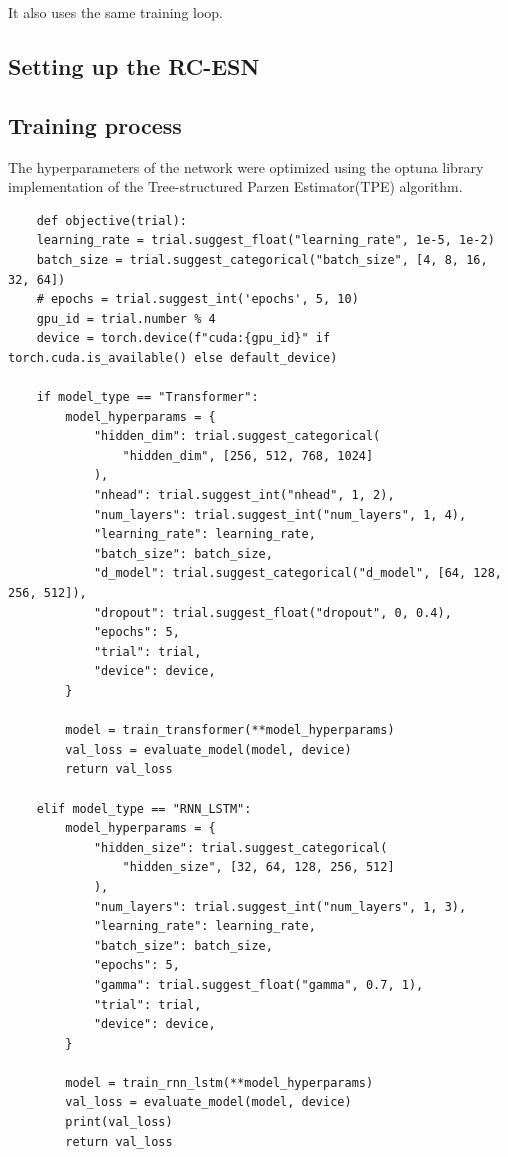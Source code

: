 \documentclass[11pt]{article}
\begin{document}
It also uses the same training loop.

\subsection{Setting up the RC-ESN}

\subsection{Training process}
The hyperparameters of the network were optimized using the optuna library implementation of the Tree-structured Parzen Estimator(TPE) algorithm. 

\begin{lstlisting}
    def objective(trial):
    learning_rate = trial.suggest_float("learning_rate", 1e-5, 1e-2)
    batch_size = trial.suggest_categorical("batch_size", [4, 8, 16, 32, 64])
    # epochs = trial.suggest_int('epochs', 5, 10)
    gpu_id = trial.number % 4  
    device = torch.device(f"cuda:{gpu_id}" if torch.cuda.is_available() else default_device)

    if model_type == "Transformer":
        model_hyperparams = {
            "hidden_dim": trial.suggest_categorical(
                "hidden_dim", [256, 512, 768, 1024]
            ),
            "nhead": trial.suggest_int("nhead", 1, 2),
            "num_layers": trial.suggest_int("num_layers", 1, 4),
            "learning_rate": learning_rate,
            "batch_size": batch_size,
            "d_model": trial.suggest_categorical("d_model", [64, 128, 256, 512]),
            "dropout": trial.suggest_float("dropout", 0, 0.4),
            "epochs": 5,
            "trial": trial,
            "device": device,
        }

        model = train_transformer(**model_hyperparams)
        val_loss = evaluate_model(model, device)
        return val_loss

    elif model_type == "RNN_LSTM":
        model_hyperparams = {
            "hidden_size": trial.suggest_categorical(
                "hidden_size", [32, 64, 128, 256, 512]
            ),
            "num_layers": trial.suggest_int("num_layers", 1, 3),
            "learning_rate": learning_rate,
            "batch_size": batch_size,
            "epochs": 5,
            "gamma": trial.suggest_float("gamma", 0.7, 1),
            "trial": trial,
            "device": device,
        }

        model = train_rnn_lstm(**model_hyperparams)
        val_loss = evaluate_model(model, device)
        print(val_loss)
        return val_loss


\end{lstlisting}
\end{document}
